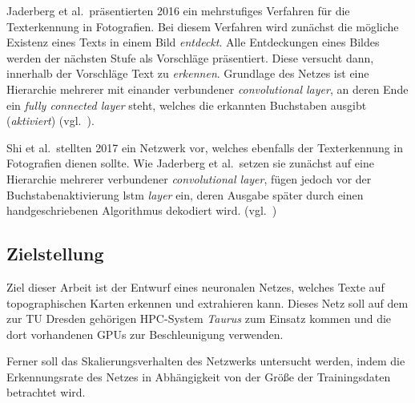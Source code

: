 Jaderberg et al.\ präsentierten 2016 ein mehrstufiges Verfahren für die Texterkennung in Fotografien. Bei diesem
Verfahren wird zunächst die mögliche Existenz eines Texts in einem Bild \textit{entdeckt}. Alle Entdeckungen eines
Bildes werden der nächsten Stufe als Vorschläge präsentiert. Diese versucht dann, innerhalb der Vorschläge Text zu
\textit{erkennen}. Grundlage des Netzes ist eine Hierarchie mehrerer mit einander verbundener
\textit{convolutional layer}, an deren Ende ein \textit{fully connected layer} steht, welches die erkannten Buchstaben
ausgibt (\textit{aktiviert}) (vgl.~\cite{jaderberg2016}).

Shi et al.\ stellten 2017 ein Netzwerk vor, welches ebenfalls der Texterkennung in Fotografien dienen sollte. Wie
Jaderberg et al.\ setzen sie zunächst auf eine Hierarchie mehrerer verbundener \textit{convolutional layer}, fügen
jedoch vor der Buchstabenaktivierung \gls{lstm} \textit{layer} ein, deren Ausgabe später durch einen handgeschriebenen
Algorithmus dekodiert wird. (vgl.~\cite{shi2017})

\subsection{Zielstellung}
\label{einleitung:zielstellung}

Ziel dieser Arbeit ist der Entwurf eines neuronalen Netzes, welches Texte auf topographischen Karten erkennen und
extrahieren kann. Dieses Netz soll auf dem zur TU Dresden gehörigen HPC-System \textit{Taurus} zum Einsatz kommen und
die dort vorhandenen GPUs zur Beschleunigung verwenden.

Ferner soll das Skalierungsverhalten des Netzwerks untersucht werden, indem die Erkennungsrate des Netzes in
Abhängigkeit von der Größe der Trainingsdaten betrachtet wird.
